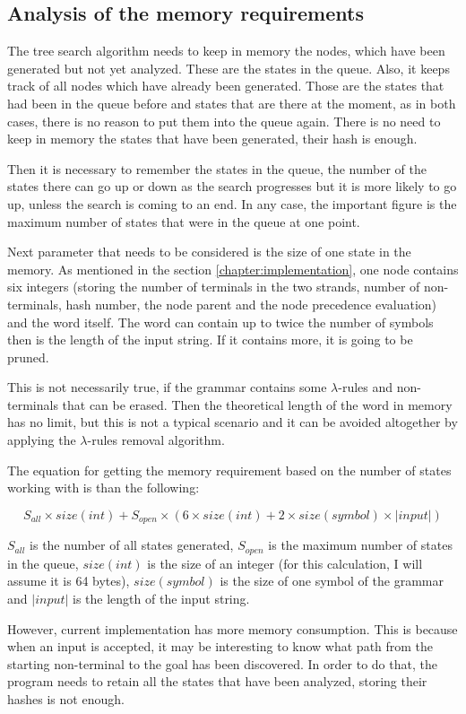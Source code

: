 \subsection{Analysis of the memory requirements}
The tree search algorithm needs to keep in memory the nodes, which have been generated but not yet analyzed. These are the states in the queue. Also, it keeps track of all nodes which have already been generated. Those are the states that had been in the queue before and states that are there at the moment, as in both cases, there is no reason to put them into the queue again. There is no need to keep in memory the states that have been generated, their hash is enough.

Then it is necessary to remember the states in the queue, the number of the states there can go up or down as the search progresses but it is more likely to go up, unless the search is coming to an end. In any case, the important figure is the maximum number of states that were in the queue at one point.

Next parameter that needs to be considered is the size of one state in the memory. As mentioned in the section \ref{chapter:implementation}, one node contains six integers (storing the number of terminals in the two strands, number of non-terminals, hash number, the node parent and the node precedence evaluation) and the word itself. The word can contain up to twice the number of symbols then is the length of the input string. If it contains more, it is going to be pruned.

This is not necessarily true, if the grammar contains some $\lambda$-rules and non-terminals that can be erased. Then the theoretical length of the word in memory has no limit, but this is not a typical scenario and it can be avoided altogether by applying the $\lambda$-rules removal algorithm.

The equation for getting the memory requirement based on the number of states working with is than the following:

$$S_{all} \times size(int) + S_{open} \times (6 \times size(int) + 2 \times size(symbol) \times |input|)$$

$S_{all}$ is the number of all states generated, $S_{open}$ is the maximum number of states in the queue, $size(int)$ is the size of an integer (for this calculation, I will assume it is 64 bytes), $size(symbol)$ is the size of one symbol of the grammar and $|input|$ is the length of the input string.

However, current implementation has more memory consumption. This is because when an input is accepted, it may be interesting to know what path from the starting non-terminal to the goal has been discovered. In order to do that, the program needs to retain all the states that have been analyzed, storing their hashes is not enough.

